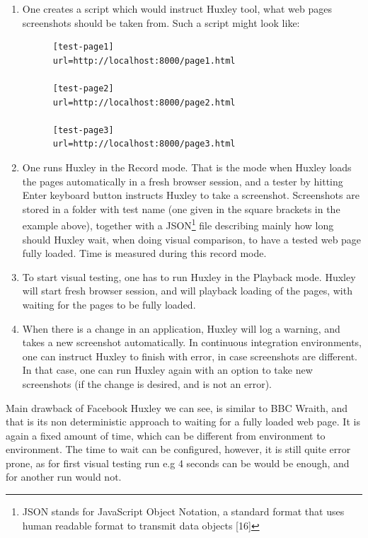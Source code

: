 \documentclass[11pt,oneside,final]{fithesis2}
\begin{document}
  \begin{enumerate}
   \item One creates a script which would instruct Huxley tool, what web pages screenshots should be taken from. Such a script might look like:
  
    \begin{verbatim}
      [test-page1]
      url=http://localhost:8000/page1.html

      [test-page2]
      url=http://localhost:8000/page2.html
   
      [test-page3]
      url=http://localhost:8000/page3.html
    \end{verbatim}
    
    \item One runs Huxley in the Record mode. That is the mode when Huxley loads the pages automatically in a fresh browser session, and a tester by hitting Enter keyboard button instructs 
    Huxley to take a screenshot. Screenshots are stored in a folder with test name (one given in the square brackets in the example above), together with a 
    JSON\footnote{JSON stands for JavaScript Object Notation, a standard format that uses human readable format to transmit data objects [16]} file describing mainly how long should 
    Huxley wait, when doing visual comparison, to have a tested web page fully loaded. Time is measured during this record mode.
    
    \item To start visual testing, one has to run Huxley in the Playback mode. Huxley will start fresh browser session, and will playback loading of the pages, with waiting for the pages
    to be fully loaded.
    
    \item When there is a change in an application, Huxley will log a warning, and takes a new screenshot automatically. In continuous integration environments, one can instruct Huxley
    to finish with error, in case screenshots are different. In that case, one can run Huxley again with an option to take new screenshots (if the change is desired, and is not an error).
   \end{enumerate}
    
   Main drawback of Facebook Huxley we can see, is similar to BBC Wraith, and that is its non deterministic approach to waiting for a fully loaded web page. It is again a fixed amount of time,
   which can be different from environment to environment. The time to wait can be configured, however, it is still quite error prone, as for first visual testing run
   e.g 4 seconds can be would be enough, and for another run would not.
    
\end{document}
